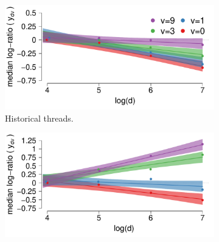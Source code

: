 \documentclass[9pt,twocolumn,twoside,lineno]{pnas-new}
\begin{document}


\begin{figure}[!h]
\centering
	\begin{subfigure}[t]{.46\linewidth}
		\centering
		\includegraphics[width=1\linewidth]{med_confidence_h.pdf}	
		\caption{\footnotesize Historical threads.}
		\label{fig: median confidence bounds - historic}
	\end{subfigure}
	\begin{subfigure}[t]{.46\linewidth}
		\centering
		\includegraphics[width=1\linewidth]{med_confidence_m.pdf}		

\end{subfigure}
\end{figure}
\end{document}
